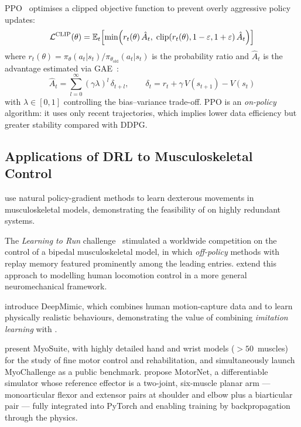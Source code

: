 PPO~\parencite{Schulman2017} optimises a clipped objective function to prevent
overly aggressive policy updates:
\begin{equation}
  \mathcal{L}^\text{CLIP}(\theta) =
  \mathbb{E}_t\!\left[\min\!\left(r_t(\theta)\,\hat{A}_t,\;
  \mathrm{clip}\!\left(r_t(\theta), 1-\varepsilon, 1+\varepsilon\right)\hat{A}_t\right)\right]
  \label{eq:ppo_clip}
\end{equation}
where $r_t(\theta) = \pi_\theta(a_t|s_t)/\pi_{\theta_\text{old}}(a_t|s_t)$ is the
probability ratio and $\hat{A}_t$ is the advantage estimated via GAE~\parencite{Schulman2016}:
\begin{equation}
  \hat{A}_t = \sum_{l=0}^{\infty} (\gamma\lambda)^l\,\delta_{t+l}, \qquad
  \delta_t = r_t + \gamma\,V(s_{t+1}) - V(s_t)
  \label{eq:gae}
\end{equation}
with $\lambda \in [0,1]$ controlling the bias--variance trade-off. PPO is an
\textit{on-policy} algorithm: it uses only recent trajectories, which implies lower
data efficiency but greater stability compared with DDPG.

\subsection{Applications of DRL to Musculoskeletal Control}

\textcite{Rajeswaran2017} use natural policy-gradient methods to learn dexterous
movements in musculoskeletal models, demonstrating the feasibility of \DRL{} on
highly redundant systems.

The \textit{Learning to Run} challenge~\parencite{Kidzinski2018} stimulated a
worldwide competition on the control of a bipedal musculoskeletal model, in which
\textit{off-policy} methods with replay memory featured prominently among the
leading entries. \textcite{Song2021} extend this approach to modelling human locomotion
control in a more general neuromechanical framework.

\textcite{Peng2018} introduce DeepMimic, which combines human motion-capture
data and \DRL{} to learn physically realistic behaviours, demonstrating the value of
combining \textit{imitation learning} with \DRL{}.

\textcite{Caggiano2022} present MyoSuite, with highly detailed hand and wrist
models ($>50$~muscles) for the study of fine motor control and rehabilitation, and
simultaneously launch MyoChallenge as a public benchmark.
\textcite{Codol2023} propose MotorNet, a differentiable simulator whose reference
effector is a two-joint, six-muscle planar arm --- monoarticular flexor and
extensor pairs at shoulder and elbow plus a biarticular pair --- fully integrated
into PyTorch and enabling training by backpropagation through the physics.

